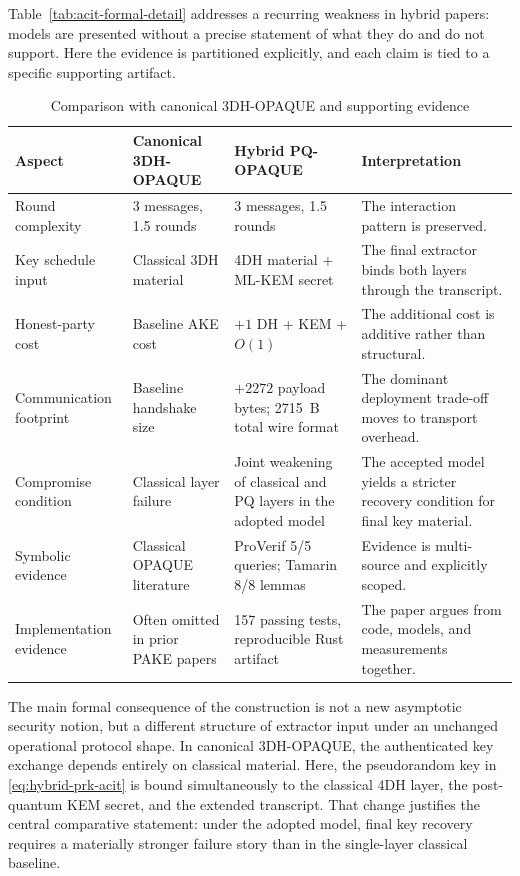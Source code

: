 \documentclass[conference]{IEEEtran}
\begin{document}
Table~\ref{tab:acit-formal-detail} addresses a recurring weakness in hybrid papers: models are presented without a precise statement of what they do and do not support. Here the evidence is partitioned explicitly, and each claim is tied to a specific supporting artifact.

\begin{table}[t]
\caption{Comparison with canonical 3DH-OPAQUE and supporting evidence}
\label{tab:acit-comparison}
\centering
\footnotesize
\begin{tabularx}{\textwidth}{@{}L{3.0cm}L{3.0cm}L{3.1cm}Y@{}}
\toprule
Aspect & Canonical 3DH-OPAQUE & Hybrid PQ-OPAQUE & Interpretation \\
\midrule
Round complexity & 3 messages, 1.5 rounds & 3 messages, 1.5 rounds & The interaction pattern is preserved. \\
Key schedule input & Classical 3DH material & 4DH material + ML-KEM secret & The final extractor binds both layers through the transcript. \\
Honest-party cost & Baseline AKE cost & $+1$ DH + KEM + $O(1)$ & The additional cost is additive rather than structural. \\
Communication footprint & Baseline handshake size & $+2272$ payload bytes; 2715~B total wire format & The dominant deployment trade-off moves to transport overhead. \\
Compromise condition & Classical layer failure & Joint weakening of classical and PQ layers in the adopted model & The accepted model yields a stricter recovery condition for final key material. \\
Symbolic evidence & Classical OPAQUE literature & ProVerif 5/5 queries; Tamarin 8/8 lemmas & Evidence is multi-source and explicitly scoped. \\
Implementation evidence & Often omitted in prior PAKE papers & 157 passing tests, reproducible Rust artifact & The paper argues from code, models, and measurements together. \\
\bottomrule
\end{tabularx}
\end{table}

The main formal consequence of the construction is not a new asymptotic security notion, but a different structure of extractor input under an unchanged operational protocol shape. In canonical 3DH-OPAQUE, the authenticated key exchange depends entirely on classical material. Here, the pseudorandom key in \eqref{eq:hybrid-prk-acit} is bound simultaneously to the classical 4DH layer, the post-quantum KEM secret, and the extended transcript. That change justifies the central comparative statement: under the adopted model, final key recovery requires a materially stronger failure story than in the single-layer classical baseline.
\end{document}
